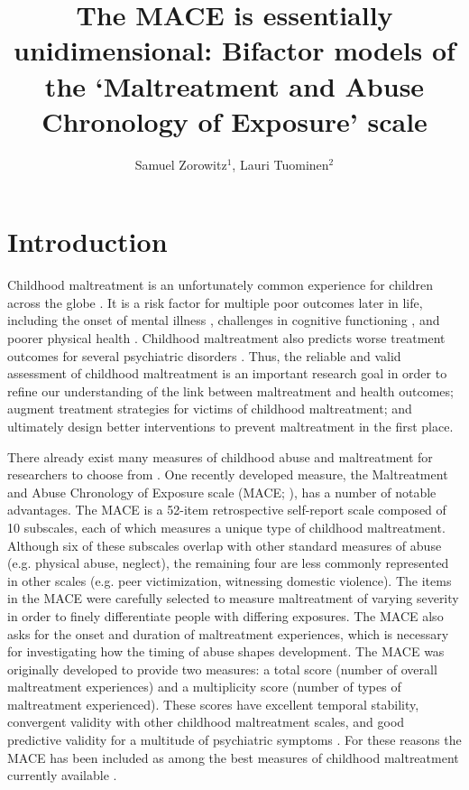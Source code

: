 \documentclass[letterpaper,man,natbib,floatsintext,longtable]{apa6}
\title{The MACE is essentially unidimensional: Bifactor models of the `Maltreatment and Abuse Chronology of Exposure' scale}
\author{Samuel Zorowitz$^1$, Lauri Tuominen$^{2}$}
\affiliation{$^1$Princeton Neuroscience Institute, Princeton University, USA\\$^2$The Royal’s Institute of Mental Health Research, University of Ottawa, Canada}
\begin{document}
\maketitle

\section{Introduction}

Childhood maltreatment is an unfortunately common experience for children across the globe \citep{stoltenborgh2015prevalence}. It is a risk factor for multiple poor outcomes later in life, including the onset of mental illness \citep{kessler2010childhood}, challenges in cognitive functioning \citep{su2019does}, and poorer physical health \citep{wegman2009meta}. Childhood maltreatment also predicts worse treatment outcomes for several psychiatric disorders \citep{nanni2012childhood, thomas2019childhood}. Thus, the reliable and valid assessment of childhood maltreatment is an important research goal in order to refine our understanding of the link between maltreatment and health outcomes; augment treatment strategies for victims of childhood maltreatment; and ultimately design better interventions to prevent maltreatment in the first place. 

There already exist many measures of childhood abuse and maltreatment for researchers to choose from \citep{saini2019systematic}. One recently developed measure, the Maltreatment and Abuse Chronology of Exposure scale (MACE; \citealt{teicher2015maltreatment}), has a number of notable advantages. The MACE is a 52-item retrospective self-report scale composed of 10 subscales, each of which measures a unique type of childhood maltreatment. Although six of these subscales overlap with other standard measures of abuse (e.g. physical abuse, neglect), the remaining four are less commonly represented in other scales (e.g. peer victimization, witnessing domestic violence). The items in the MACE were carefully selected to measure maltreatment of varying severity in order to finely differentiate people with differing exposures. The MACE also asks for the onset and duration of maltreatment experiences, which is necessary for investigating how the timing of abuse shapes development. The MACE was originally developed to provide two measures: a total score (number of overall maltreatment experiences) and a multiplicity score (number of types of maltreatment experienced). These scores have excellent temporal stability, convergent validity with other childhood maltreatment scales, and good predictive validity for a multitude of psychiatric symptoms \citep{teicher2015maltreatment}. For these reasons the MACE has been included as among the best measures of childhood maltreatment currently available \citep{saini2019systematic, georgieva2022systematic}.
\end{document}
